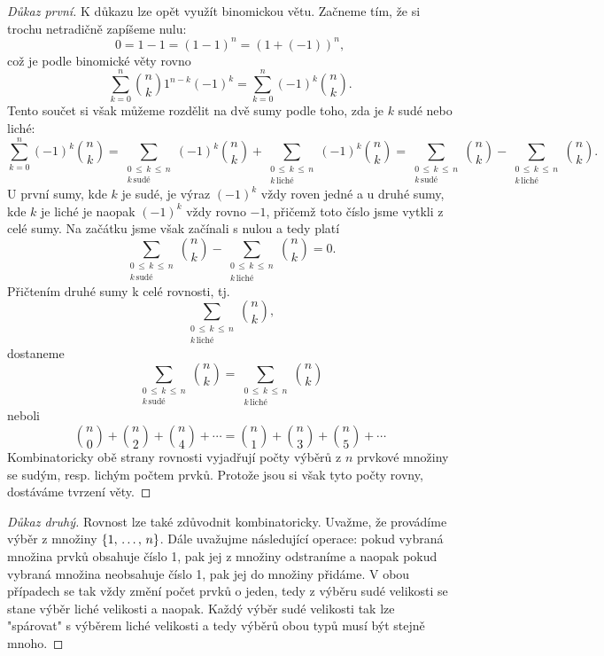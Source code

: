 \begin{proof}[Důkaz první]
    K důkazu lze opět využít binomickou větu. Začneme tím, že si trochu netradičně zapíšeme nulu:
    \[0=1-1=(1-1)^n=(1+(-1))^n,\]
    což je podle binomické věty rovno
    \[\sum_{k=0}^{n}\binom{n}{k}1^{n-k}(-1)^k=\sum_{k=0}^{n}(-1)^k\binom{n}{k}.\]
    Tento součet si však můžeme rozdělit na dvě sumy podle toho, zda je $k$ sudé nebo liché:
    \[\sum_{k=0}^{n}(-1)^k\binom{n}{k}=\sum_{\substack{0\,\leqslant\,k\,\leqslant\,n \\ k\,\text{sudé}}}(-1)^k\binom{n}{k}+\sum_{\substack{0\,\leqslant\,k\,\leqslant\,n \\ k\,\text{liché}}}(-1)^k\binom{n}{k}=\sum_{\substack{0\,\leqslant\,k\,\leqslant\,n \\ k\,\text{sudé}}}\binom{n}{k}-\sum_{\substack{0\,\leqslant\,k\,\leqslant\,n \\ k\,\text{liché}}}\binom{n}{k}.\]
    U první sumy, kde $k$ je sudé, je výraz $(-1)^k$ vždy roven jedné a u druhé sumy, kde $k$ je liché je naopak $(-1)^k$ vždy rovno $-1$, přičemž toto číslo jsme vytkli z celé sumy. Na začátku jsme však začínali s nulou a tedy platí
    \[\sum_{\substack{0\,\leqslant\,k\,\leqslant\,n \\ k\,\text{sudé}}}\binom{n}{k}-\sum_{\substack{0\,\leqslant\,k\,\leqslant\,n \\ k\,\text{liché}}}\binom{n}{k}=0.\]
    Přičtením druhé sumy k celé rovnosti, tj.
    \[\sum_{\substack{0\,\leqslant\,k\,\leqslant\,n \\ k\,\text{liché}}}\binom{n}{k},\]
    dostaneme
    \[\sum_{\substack{0\,\leqslant\,k\,\leqslant\,n \\ k\,\text{sudé}}}\binom{n}{k}=\sum_{\substack{0\,\leqslant\,k\,\leqslant\,n \\ k\,\text{liché}}}\binom{n}{k}\]
    neboli
    \[\binom{n}{0}+\binom{n}{2}+\binom{n}{4}+\cdots=\binom{n}{1}+\binom{n}{3}+\binom{n}{5}+\cdots\]
    Kombinatoricky obě strany rovnosti vyjadřují počty výběrů z $n$ prvkové množiny se sudým, resp. lichým počtem prvků. Protože jsou si však tyto počty rovny, dostáváme tvrzení věty.
\end{proof}
\begin{proof}[Důkaz druhý]
    Rovnost lze také zdůvodnit kombinatoricky. Uvažme, že provádíme výběr z množiny $\left\{1,\,\dots,\,n\right\}$. Dále uvažujme následující operace: pokud vybraná množina prvků obsahuje číslo 1, pak jej z množiny odstraníme a naopak pokud vybraná množina neobsahuje číslo 1, pak jej do množiny přidáme. V obou případech se tak vždy změní počet prvků o jeden, tedy z výběru sudé velikosti se stane výběr liché velikosti a naopak. Každý výběr sudé velikosti tak lze "spárovat" s výběrem liché velikosti a tedy výběrů obou typů musí být stejně mnoho.
\end{proof}

